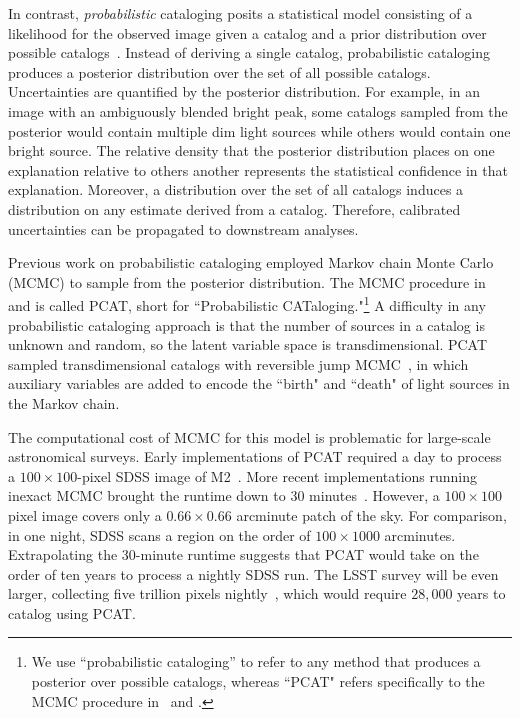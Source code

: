 In contrast, {\itshape probabilistic} cataloging posits a statistical model consisting of a likelihood for the observed image given a catalog and a prior distribution over possible catalogs~\citep{Portillo_2017, Brewer_2013, Feder_2019}.
Instead of deriving a single catalog, probabilistic cataloging produces a posterior distribution over the set of all possible catalogs.
Uncertainties are quantified by the posterior distribution.
For example, in an image with an ambiguously blended bright peak, some catalogs sampled from the posterior would contain multiple dim light sources while others would contain one bright source.
The relative density that the posterior distribution places on one explanation
relative to others another represents the statistical confidence in that explanation.
Moreover, a distribution over the set of all catalogs induces a distribution on any estimate derived from a catalog. Therefore, calibrated uncertainties can be propagated to downstream analyses.

Previous work on probabilistic cataloging employed Markov chain Monte Carlo (MCMC) to sample from the posterior distribution.
The MCMC procedure in~\cite{Portillo_2017} and \cite{Feder_2019}
is called PCAT, short for ``Probabilistic CATaloging."\footnote{
We use ``probabilistic cataloging'' to refer to any method that produces a posterior over possible catalogs, whereas ``PCAT" refers specifically to the MCMC procedure in~\cite{Portillo_2017} and \cite{Feder_2019}. }
A difficulty in any probabilistic cataloging approach is that the number of sources in a catalog is unknown and random, so the latent variable space is transdimensional. PCAT sampled transdimensional catalogs with reversible jump MCMC~\citep{Green95reversiblejump}, in which
auxiliary variables are added to encode the ``birth" and ``death" of light sources in the Markov chain.

The computational cost of MCMC for this model is problematic for large-scale astronomical surveys.
Early implementations of PCAT required a day to process a $100\times 100$-pixel SDSS image of M2~\citep{Portillo_2017}.
More recent implementations running inexact MCMC brought the runtime down to 30  minutes~\citep{Feder_2019}.
However, a $100\times 100$ pixel image covers only a $0.66 \times 0.66$ arcminute patch of the sky.
For comparison, in one night, SDSS scans a region on the order of $100 \times 1000$ arcminutes.
Extrapolating the 30-minute runtime suggests that PCAT would take on the order of ten years to process a nightly SDSS run.
The LSST survey will be even larger, collecting five trillion pixels nightly~\citep{LSSTnumbers}, which would require $28,000$ years to catalog using PCAT. 

